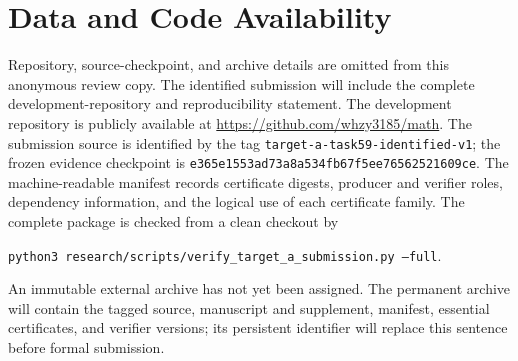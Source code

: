 \section*{Data and Code Availability}
\label{sec:data-code}

\ifdefined\TargetAAnonymous
Repository, source-checkpoint, and archive details are omitted from this
anonymous review copy.  The identified submission will include the complete
development-repository and reproducibility statement.
\else
The development repository is publicly available at
\url{https://github.com/whzy3185/math}. The submission source is identified
by the tag \texttt{target-a-task59-identified-v1}; the frozen evidence
checkpoint is
\texttt{e365e1553ad73a8a534f\allowbreak b67f5ee76562521609ce}. The
machine-readable manifest records certificate digests, producer and verifier
roles, dependency information, and the logical use of each certificate
family. The complete package is checked from a clean checkout by
\begin{center}
\texttt{python3 research/scripts/verify\_target\_a\_submission.py --full}.
\end{center}

An immutable external archive has not yet been assigned. The permanent
archive will contain the tagged source, manuscript and supplement, manifest,
essential certificates, and verifier versions; its persistent identifier
will replace this sentence before formal submission.
\fi
